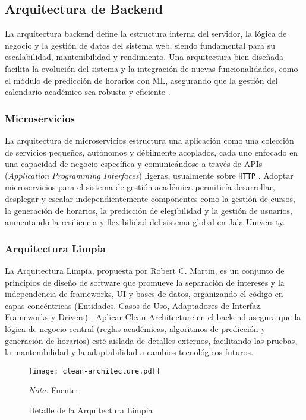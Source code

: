 \subsection{Arquitectura de Backend}
La arquitectura backend define la estructura interna del servidor, la lógica de negocio y la gestión de datos del sistema web, siendo fundamental para su escalabilidad, mantenibilidad y rendimiento.
Una arquitectura bien diseñada facilita la evolución del sistema y la integración de nuevas funcionalidades, como el módulo de predicción de horarios con ML, asegurando que la gestión del calendario académico sea robusta y eficiente \parencite{Richards2015}.

\subsubsection{Microservicios}
La arquitectura de microservicios estructura una aplicación como una colección de servicios pequeños, autónomos y débilmente acoplados, cada uno enfocado en una capacidad de negocio específica y comunicándose a través de APIs (\textit{Application Programming Interfaces}) ligeras, usualmente sobre \texttt{HTTP} \parencite{Newman2015}.
Adoptar microservicios para el sistema de gestión académica permitiría desarrollar, desplegar y escalar independientemente componentes como la gestión de cursos, la generación de horarios, la predicción de elegibilidad y la gestión de usuarios, aumentando la resiliencia y flexibilidad del sistema global en Jala University.

\subsubsection{Arquitectura Limpia}
La Arquitectura Limpia, propuesta por Robert C.
Martin, es un conjunto de principios de diseño de software que promueve la separación de intereses y la independencia de frameworks, UI y bases de datos, organizando el código en capas concéntricas (Entidades, Casos de Uso, Adaptadores de Interfaz, Frameworks y Drivers) \parencite{Martin2017}.
Aplicar Clean Architecture en el backend asegura que la lógica de negocio central (reglas académicas, algoritmos de predicción y generación de horarios) esté aislada de detalles externos, facilitando las pruebas, la mantenibilidad y la adaptabilidad a cambios tecnológicos futuros.

\begin{figure}
    \centering
	\caption{Detalle de la Arquitectura Limpia} \label{fig:cleanCodeBlog}
	\texttt{[image: clean-architecture.pdf]}

    \vspace{0.5em}
    \begin{minipage}{\textwidth}
        \small\textit{Nota.} Fuente: \textcite{CleanCodeBlog}
    \end{minipage}
\end{figure}


